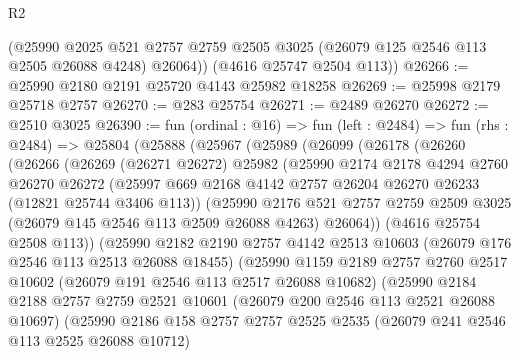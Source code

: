 \begin{lexlean}{R2}
\begin{coremodule}
        (@25990
          @2025
          @521
          @2757
          @2759
          @2505
          @3025
          (@26079 @125 @2546 @113 @2505 @26088 @4248)
          @26064))
      (@4616 @25747 @2504 @113))
@26266 := @25990 @2180 @2191 @25720 @4143 @25982 @18258
@26269 := @25998 @2179 @25718 @2757
@26270 := @283 @25754
@26271 := @2489 @26270
@26272 := @2510 @3025
@26390 := fun (ordinal : @16) =>
  fun (left : @2484) =>
  fun (rhs : @2484) =>
  @25804
    (@25888
      (@25967
        (@25989
          (@26099
            (@26178
              (@26260
                (@26266
                  (@26269
                    (@26271 @26272)
                    @25982
                    (@25990
                      @2174
                      @2178
                      @4294
                      @2760
                      @26270
                      @26272
                      (@25997
                        @669
                        @2168
                        @4142
                        @2757
                        @26204
                        @26270
                        @26233
                        (@12821 @25744 @3406 @113))
                      (@25990
                        @2176
                        @521
                        @2757
                        @2759
                        @2509
                        @3025
                        (@26079 @145 @2546 @113 @2509 @26088 @4263)
                        @26064))
                    (@4616 @25754 @2508 @113))
                  (@25990
                    @2182
                    @2190
                    @2757
                    @4142
                    @2513
                    @10603
                    (@26079 @176 @2546 @113 @2513 @26088 @18455)
                    (@25990
                      @1159
                      @2189
                      @2757
                      @2760
                      @2517
                      @10602
                      (@26079 @191 @2546 @113 @2517 @26088 @10682)
                      (@25990
                        @2184
                        @2188
                        @2757
                        @2759
                        @2521
                        @10601
                        (@26079 @200 @2546 @113 @2521 @26088 @10697)
                        (@25990
                          @2186
                          @158
                          @2757
                          @2757
                          @2525
                          @2535
                          (@26079 @241 @2546 @113 @2525 @26088 @10712)

\end{coremodule}
\end{lexlean}
